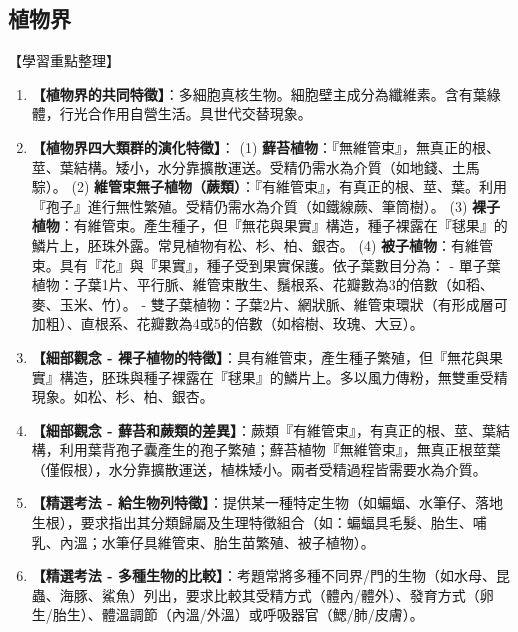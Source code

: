 \documentclass[11pt,a4paper]{article}
\begin{document}
\subsection{植物界}
\begin{learningpoints}{【學習重點整理】}
\begin{enumerate}[label=\arabic*.]
  \item \textbf{【植物界的共同特徵】}：多細胞真核生物。細胞壁主成分為纖維素。含有葉綠體，行光合作用自營生活。具世代交替現象。
  \item \textbf{【植物界四大類群的演化特徵】}：
  (1) \textbf{蘚苔植物}：『無維管束』，無真正的根、莖、葉結構。矮小，水分靠擴散運送。受精仍需水為介質（如地錢、土馬騌）。
  (2) \textbf{維管束無子植物（蕨類）}：『有維管束』，有真正的根、莖、葉。利用『孢子』進行無性繁殖。受精仍需水為介質（如鐵線蕨、筆筒樹）。
  (3) \textbf{裸子植物}：有維管束。產生種子，但『無花與果實』構造，種子裸露在『毬果』的鱗片上，胚珠外露。常見植物有松、杉、柏、銀杏。
  (4) \textbf{被子植物}：有維管束。具有『花』與『果實』，種子受到果實保護。依子葉數目分為：
     - 單子葉植物：子葉1片、平行脈、維管束散生、鬚根系、花瓣數為3的倍數（如稻、麥、玉米、竹）。
     - 雙子葉植物：子葉2片、網狀脈、維管束環狀（有形成層可加粗）、直根系、花瓣數為4或5的倍數（如榕樹、玫瑰、大豆）。
  \item \textbf{【細部觀念 - 裸子植物的特徵】}：具有維管束，產生種子繁殖，但『無花與果實』構造，胚珠與種子裸露在『毬果』的鱗片上。多以風力傳粉，無雙重受精現象。如松、杉、柏、銀杏。
  \item \textbf{【細部觀念 - 蘚苔和蕨類的差異】}：蕨類『有維管束』，有真正的根、莖、葉結構，利用葉背孢子囊產生的孢子繁殖；蘚苔植物『無維管束』，無真正根莖葉（僅假根），水分靠擴散運送，植株矮小。兩者受精過程皆需要水為介質。
  \item \textbf{【精選考法 - 給生物列特徵】}：提供某一種特定生物（如蝙蝠、水筆仔、落地生根），要求指出其分類歸屬及生理特徵組合（如：蝙蝠具毛髮、胎生、哺乳、內溫；水筆仔具維管束、胎生苗繁殖、被子植物）。
  \item \textbf{【精選考法 - 多種生物的比較】}：考題常將多種不同界/門的生物（如水母、昆蟲、海豚、鯊魚）列出，要求比較其受精方式（體內/體外）、發育方式（卵生/胎生）、體溫調節（內溫/外溫）或呼吸器官（鰓/肺/皮膚）。
\end{enumerate}
\end{learningpoints}
\end{document}

